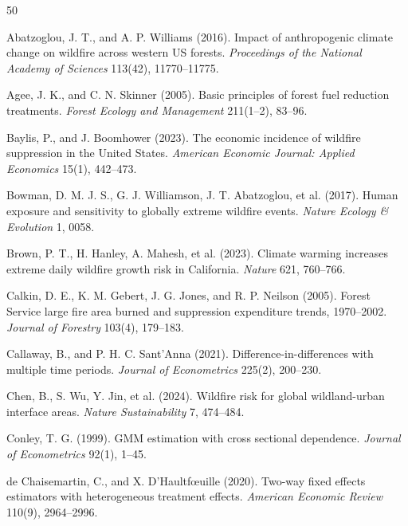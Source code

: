 \documentclass[12pt, letterpaper]{article}
\begin{document}
\newpage
\singlespacing

\begin{thebibliography}{50}

Abatzoglou, J. T., and A. P. Williams (2016). Impact of anthropogenic climate change on wildfire across western US forests. \textit{Proceedings of the National Academy of Sciences} 113(42), 11770--11775.

Agee, J. K., and C. N. Skinner (2005). Basic principles of forest fuel reduction treatments. \textit{Forest Ecology and Management} 211(1--2), 83--96.

Baylis, P., and J. Boomhower (2023). The economic incidence of wildfire suppression in the United States. \textit{American Economic Journal: Applied Economics} 15(1), 442--473.

Bowman, D. M. J. S., G. J. Williamson, J. T. Abatzoglou, et al. (2017). Human exposure and sensitivity to globally extreme wildfire events. \textit{Nature Ecology \& Evolution} 1, 0058.

Brown, P. T., H. Hanley, A. Mahesh, et al. (2023). Climate warming increases extreme daily wildfire growth risk in California. \textit{Nature} 621, 760--766.

Calkin, D. E., K. M. Gebert, J. G. Jones, and R. P. Neilson (2005). Forest Service large fire area burned and suppression expenditure trends, 1970--2002. \textit{Journal of Forestry} 103(4), 179--183.

Callaway, B., and P. H. C. Sant'Anna (2021). Difference-in-differences with multiple time periods. \textit{Journal of Econometrics} 225(2), 200--230.

Chen, B., S. Wu, Y. Jin, et al. (2024). Wildfire risk for global wildland-urban interface areas. \textit{Nature Sustainability} 7, 474--484.

Conley, T. G. (1999). GMM estimation with cross sectional dependence. \textit{Journal of Econometrics} 92(1), 1--45.

de Chaisemartin, C., and X. D'Haultf{\oe}uille (2020). Two-way fixed effects estimators with heterogeneous treatment effects. \textit{American Economic Review} 110(9), 2964--2996.


\end{thebibliography}
\end{document}
